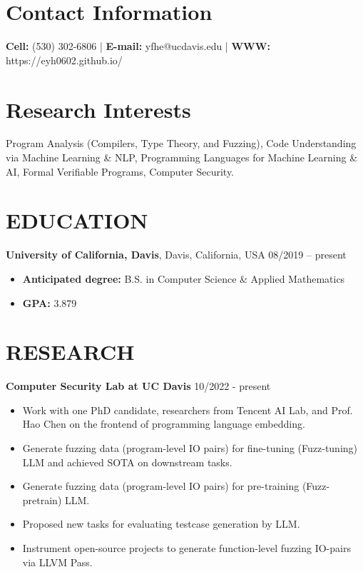 \documentclass[margin,line]{res}
\begin{document}

\begin{resume}
\section{\sc Contact Information}
\vspace{.05in}
\textbf{Cell:} (530) 302-6806 |
\textbf{E-mail:} yfhe@ucdavis.edu |
\textbf{WWW:} https://eyh0602.github.io/


\section{\sc Research Interests}
Program Analysis (Compilers, Type Theory, and Fuzzing),
Code Understanding via Machine Learning \& NLP,
Programming Languages for Machine Learning \& AI,
Formal Verifiable Programs,
Computer Security.


\section{\sc EDUCATION}
\textbf{University of California, Davis}, Davis, California, USA \hfill {08/2019 -- present} \\
\begin{itemize}
	\item \textbf{Anticipated degree:} B.S. in Computer Science \& Applied Mathematics
	\item \textbf{GPA:} 3.879
\end{itemize}

\section{\sc RESEARCH}
\textbf{Computer Security Lab at UC Davis} \hfill 10/2022 - present \\
\begin{itemize}
	\item Work with one PhD candidate, researchers from Tencent AI Lab, and Prof. Hao Chen on the frontend of programming language embedding.
	\item Generate fuzzing data (program-level IO pairs) for fine-tuning (Fuzz-tuning) LLM and achieved SOTA on downstream tasks.
	\item Generate fuzzing data (program-level IO pairs) for pre-training (Fuzz-pretrain) LLM.
	\item Proposed new tasks for evaluating testcase generation by LLM.
	\item Instrument open-source projects to generate function-level fuzzing IO-pairs via LLVM Pass.
\end{itemize}


\end{resume}
\end{document}
